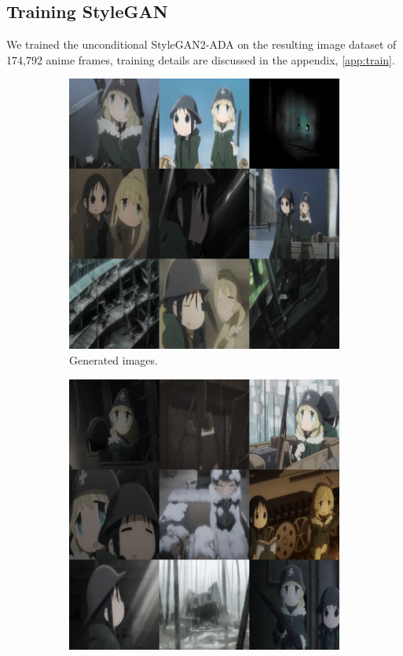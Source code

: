 \documentclass[11pt, oneside]{article}
\begin{document}
\subsection{Training StyleGAN}
We trained the unconditional StyleGAN2-ADA \cite{stylegan2ada}
on the resulting image dataset of 174,792 anime frames, training
details are discussed in the appendix, \autoref{app:train}.

\begin{figure}[h!]
    \centering
    \begin{subfigure}[h]{0.49 \textwidth}
      \includegraphics[scale=0.25]{samples_gan}
      \caption{Generated images.}
    \end{subfigure}
    \hfill
    \begin{subfigure}[h]{0.49 \textwidth}
      \includegraphics[scale=0.25]{samples_real}

\end{subfigure}
\end{figure}
\end{document}
